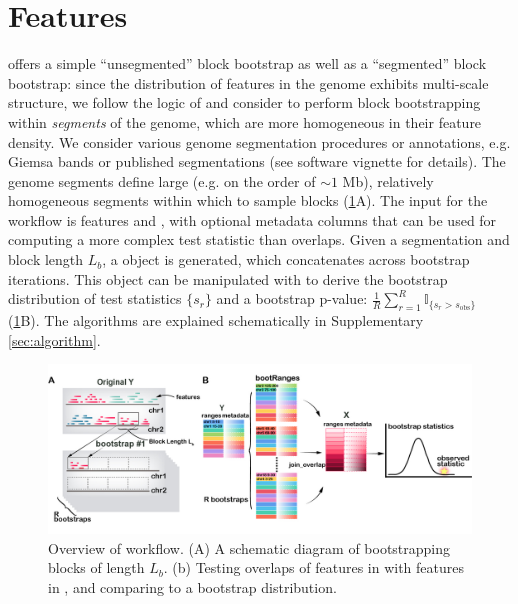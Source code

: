 \section{Features}

\bootranges offers a simple ``unsegmented'' block bootstrap as well as
a ``segmented'' block bootstrap:
since the distribution of features in the genome exhibits multi-scale
structure, we follow the logic of \citet{bickel2010subsampling} and consider to
perform block bootstrapping within \textit{segments} of the genome, which are
more homogeneous in their feature density.
We consider various genome segmentation procedures
or annotations, e.g. Giemsa bands or published segmentations
(see software vignette for details).
The genome segments define large (e.g. on the order of ${\sim}1$ Mb),
relatively homogeneous segments within which to sample blocks
(\cref{fig:framework}A). 
The input for the workflow is \granges features  and
, with optional metadata columns that can be
used for computing a more complex test statistic than overlaps.
Given a segmentation and block length $L_b$, a \bootranges
object is generated, which concatenates \granges across bootstrap
iterations. This \bootranges object can be manipulated with \plyranges
to derive the bootstrap distribution of test statistics $\{s_r\}$ and a
bootstrap p-value:
$ \frac{1}{R} \sum_{r=1}^R \mathbb{I}_{\{s_r > s_\text{obs}\}} $ (\cref{fig:framework}B).
The \bootranges algorithms are explained schematically in Supplementary \cref{sec:algorithm}.

\vspace{-0.5cm}
\begin{figure}[htbp]
\centering%
\setlength{\abovecaptionskip}{-0.05cm}
\includegraphics[scale=0.65]{Figures/bootRanges.jpg}
\caption{Overview of \bootranges workflow. (A) A schematic
  diagram of bootstrapping blocks of length $L_b$.
  (b) Testing overlaps of features in  with features in
  , and comparing to a bootstrap distribution.} 
\label{fig:framework}
\vspace{-0.5cm}
\end{figure}

